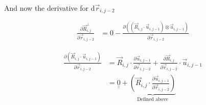 \documentclass{article}
\renewcommand{\ij}{_{i,j}}
\newcommand{\ijj}{_{i,j-1}}
\newcommand{\ijk}{_{i,j-2}}
\newcommand{\ijjj}{_{i,j-2}}
\renewcommand{\part}[2]{\frac{\partial #1 }{\partial #2}}
\newcommand{\ten}[1]{\underline{\underline{#1}}}
\newcommand{\Rij}{\vec{R} \ij}
\newcommand{\rijjj}{\vec{r} \ijjj}
\newcommand{\uijj}{\vec{u} \ijj}
\begin{document}
And now the derivative for d$\rijjj$

\begin{align*}
  \part{\vec{R}\ij ^ \bot}{\vec{r}\ijk}  &=  
  0
  - \part{\left(\left(\vec{R}\ij \cdot \vec{u} \ijj \right) \otimes 
  \vec{u} \ijj \right)
  }{\vec{r}\ijjj}
\end{align*}


\begin{align*}
  \part{\left(\vec{R}\ij \cdot \vec{u} \ijj \right)}{\vec{r}\ijk}   
  &= 
  \vec{R}\ij \cdot \part{\vec{u} \ijj}{\vec{r} \ijjj} + 
  \part{\vec{R} \ij}{\vec{r} \ijjj} \cdot \vec{u}\ijj
  \\
  &= 
  \ten{0} + 
  \underbrace{
  \left(
  \Rij \cdot  \part{\uijj}{\rijjj} 
  \right)}_{\text{Defined above}}
\end{align*}
\end{document}
